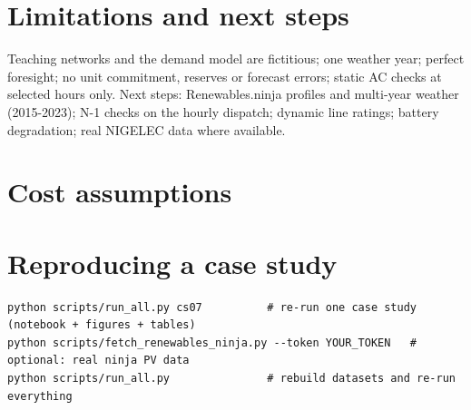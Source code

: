 \documentclass[11pt,a4paper]{article}
\begin{document}
\section{Limitations and next steps}
Teaching networks and the demand model are fictitious; one weather year; perfect foresight; no
unit commitment, reserves or forecast errors; static AC checks at selected hours only. Next steps:
Renewables.ninja profiles and multi-year weather (2015-2023); N-1 checks on the hourly dispatch;
dynamic line ratings; battery degradation; real NIGELEC data where available.

\appendix
\section{Cost assumptions}
\begin{center}\small
{}
\end{center}

\section{Reproducing a case study}
\begin{lstlisting}
python scripts/run_all.py cs07          # re-run one case study (notebook + figures + tables)
python scripts/fetch_renewables_ninja.py --token YOUR_TOKEN   # optional: real ninja PV data
python scripts/run_all.py               # rebuild datasets and re-run everything
\end{lstlisting}
\end{document}
